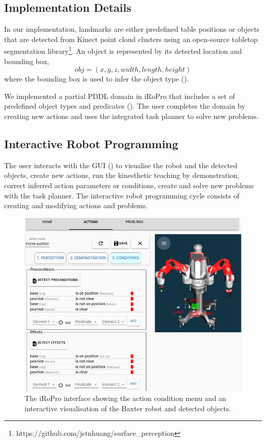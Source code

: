 \subsection{Implementation Details}
\label{sec:implementation}
In our implementation, landmarks are either predefined table positions or 
objects that are detected from Kinect point cloud clusters using an open-source tabletop segmentation library\footnote{https://github.com/jstnhuang/surface_perception}.
An object is represented by its detected location and bounding box, \ie 
$$obj = (x,y,z, width, length, height)$$ 
where the bounding box is used to infer the object type ().

We implemented a partial PDDL domain in iRoPro that includes a set of predefined object types and predicates ().
The user completes the domain by creating new actions and uses the integrated task planner to solve new problems.


\subsection{Interactive Robot Programming}
\label{sec:interactive}
The user interacts with the GUI () to visualise the robot and the detected objects, create new actions, run the kinesthetic teaching by demonstration, correct inferred action parameters or conditions, create and solve new problems with the task planner.
The interactive robot programming cycle consists of creating and modifying actions and problems.

\begin{figure}[h]
	\includegraphics[width=\linewidth]{figures/gui.png}
	\caption{The iRoPro interface showing the action condition menu and an interactive visualisation of the Baxter robot and detected objects.}\label{fig:gui-action-3}%
\end{figure}

